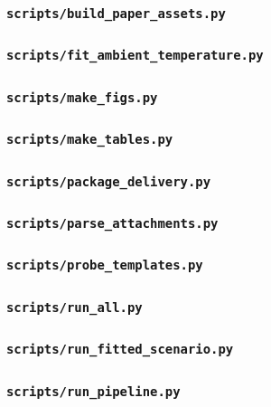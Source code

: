 \subsubsection*{\texttt{scripts/build\_paper\_assets.py}}

\subsubsection*{\texttt{scripts/fit\_ambient\_temperature.py}}

\subsubsection*{\texttt{scripts/make\_figs.py}}

\subsubsection*{\texttt{scripts/make\_tables.py}}

\subsubsection*{\texttt{scripts/package\_delivery.py}}

\subsubsection*{\texttt{scripts/parse\_attachments.py}}

\subsubsection*{\texttt{scripts/probe\_templates.py}}

\subsubsection*{\texttt{scripts/run\_all.py}}

\subsubsection*{\texttt{scripts/run\_fitted\_scenario.py}}

\subsubsection*{\texttt{scripts/run\_pipeline.py}}

